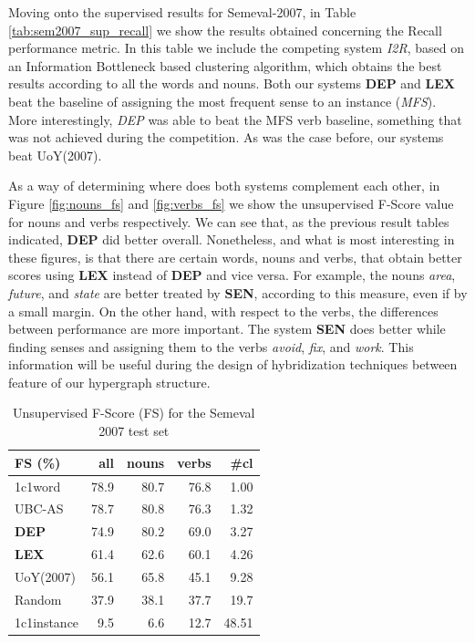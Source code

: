 Moving onto the supervised results for Semeval-2007, in Table \ref{tab:sem2007_sup_recall} we show the results obtained concerning the Recall performance metric.  In this table we include the competing system \textit{I2R}, based on an Information Bottleneck based clustering algorithm, which obtains the best results according to all the words and nouns. Both our systems \textbf{DEP} and \textbf{LEX} beat the baseline of assigning the most frequent sense to an instance (\textit{MFS}). More interestingly, \textit{DEP} was able to beat the MFS verb baseline, something that was not achieved during the competition. As was the case before, our systems beat UoY(2007).




As a way of determining where does both systems complement each other, in Figure \ref{fig:nouns_fs} and \ref{fig:verbs_fs} we show the unsupervised F-Score value for nouns and verbs respectively. We can see that, as the previous result tables indicated, \textbf{DEP} did better overall. Nonetheless, and what is most interesting in these figures, is that there are certain words, nouns and verbs, that obtain better scores using \textbf{LEX} instead of \textbf{DEP} and vice versa. For example, the nouns \textit{area}, \textit{future}, and \textit{state} are better treated by \textbf{SEN}, according to this measure, even if by a small margin. On the other hand, with respect to the verbs, the differences between performance are more important. The system \textbf{SEN} does better while finding senses and assigning them to the verbs \textit{avoid}, \textit{fix}, and \textit{work}. This information will be useful during the design of hybridization techniques between feature of our hypergraph structure.

 

\begin{table}[!htb]
\centering

\begin{tabular}{@{}lrrrr@{}}
\toprule
\textbf{FS (\%)} & \textbf{all} & \textbf{nouns} & \textbf{verbs} & \textbf{\#cl} \\ \midrule
1c1word          & 78.9         & 80.7           & 76.8           & 1.00             \\
UBC-AS           & 78.7         & 80.8           & 76.3           & 1.32          \\
\textbf{DEP}     & 74.9         & 80.2           & 69.0           & 3.27          \\
\textbf{LEX}     & 61.4         & 62.6           & 60.1           & 4.26         \\
UoY(2007)        & 56.1         & 65.8           & 45.1           & 9.28          \\
Random           & 37.9         & 38.1           & 37.7           & 19.7             \\
1c1instance & 	9.5         & 6.6           & 12.7           & 48.51             \\ \bottomrule
\end{tabular}
\caption{Unsupervised F-Score (FS) for the Semeval 2007 test set}
\label{tab:sem2007_unsup_FS}
\end{table}
 

